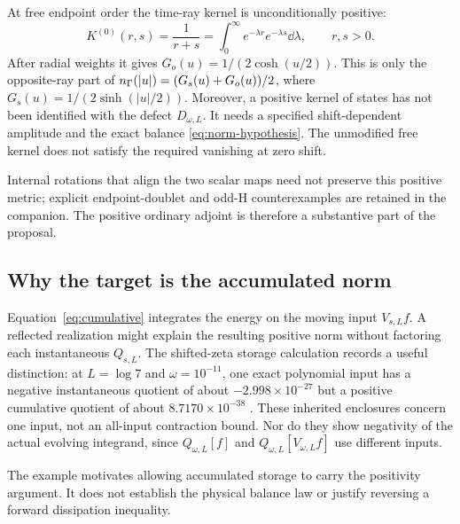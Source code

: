 At free endpoint order the time-ray kernel is unconditionally
positive:
\begin{equation}
 K^{(0)}(r,s)=\frac1{r+s}
 =\int_0^\infty e^{-\lambda r}e^{-\lambda s}\dd\lambda,
 \qquad r,s>0.
\end{equation}
After radial weights it gives
$G_o(u)=1/(2\cosh(u/2))$.
This is only the opposite-ray part of
$n_\Gamma(|u|)=(G_s(u)+G_o(u))/2$, where
$G_s(u)=1/(2\sinh(|u|/2))$.
Moreover, a positive kernel of states has not been identified
with the defect $D_{\omega,L}$.
It needs a specified shift-dependent amplitude and the exact balance
\eqref{eq:norm-hypothesis}. The unmodified free kernel does not
satisfy the required vanishing at zero shift.

Internal rotations that align the two scalar maps need not
preserve this positive metric; explicit endpoint-doublet and odd-H
counterexamples are retained in the companion. The positive
ordinary adjoint is therefore a substantive part of the proposal.

\subsection{Why the target is the accumulated norm}

Equation~\eqref{eq:cumulative} integrates the energy on the moving
input $V_{s,L}f$. A reflected realization might explain the resulting
positive norm without factoring each instantaneous $Q_{s,L}$.
The shifted-zeta storage calculation records a useful distinction:
at $L=\log7$ and $\omega=10^{-11}$, one exact polynomial input has
a negative instantaneous quotient of about $-2.998\times10^{-27}$
but a positive cumulative quotient of about
$8.7170\times10^{-38}$
\cite[Appendix~A]{StorageDepth}.
These inherited enclosures concern one input, not an all-input
contraction bound. Nor do they show negativity of the actual
evolving integrand, since $Q_{\omega,L}[f]$ and
$Q_{\omega,L}[V_{\omega,L}f]$ use different inputs.

The example motivates allowing accumulated storage to carry the
positivity argument. It does not establish the physical balance
law or justify reversing a forward dissipation inequality.
